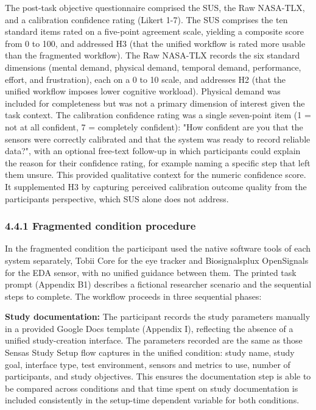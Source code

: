 \documentclass[
]{article}
\begin{document}
The post-task objective questionnaire comprised the SUS, the Raw NASA-TLX, and a calibration confidence rating (Likert 1-7). The SUS comprises the ten standard items rated on a five-point agreement scale, yielding a composite score from 0 to 100, and addressed H3 (that the unified workflow is rated more usable than the fragmented workflow). The Raw NASA-TLX records the six standard dimensions (mental demand, physical demand, temporal demand, performance, effort, and frustration), each on a 0 to 10 scale, and addresses H2 (that the unified workflow imposes lower cognitive workload). Physical demand was included for completeness but was not a primary dimension of interest given the task context. The calibration confidence rating was a single seven-point item (1 = not at all confident, 7 = completely confident): "How confident are you that the sensors were correctly calibrated and that the system was ready to record reliable data?", with an optional free-text follow-up in which participants could explain the reason for their confidence rating, for example naming a specific step that left them unsure. This provided qualitative context for the numeric confidence score. It supplemented H3 by capturing perceived calibration outcome quality from the participant\textquotesingle s perspective, which SUS alone does not address.

\hypertarget{fragmented-condition-procedure}{%
\subsubsection{4.4.1 Fragmented condition procedure}\label{fragmented-condition-procedure}}

In the fragmented condition the participant used the native software tools of each system separately, Tobii Core for the eye tracker and Biosignalsplux OpenSignals for the EDA sensor, with no unified guidance between them. The printed task prompt (Appendix B1) describes a fictional researcher scenario and the sequential steps to complete. The workflow proceeds in three sequential phases:

\textbf{Study documentation:} The participant records the study parameters manually in a provided Google Docs template (Appendix I), reflecting the absence of a unified study-creation interface. The parameters recorded are the same as those Sensa\textquotesingle s Study Setup flow captures in the unified condition: study name, study goal, interface type, test environment, sensors and metrics to use, number of participants, and study objectives. This ensures the documentation step is able to be compared across conditions and that time spent on study documentation is included consistently in the setup-time dependent variable for both conditions.
\end{document}
